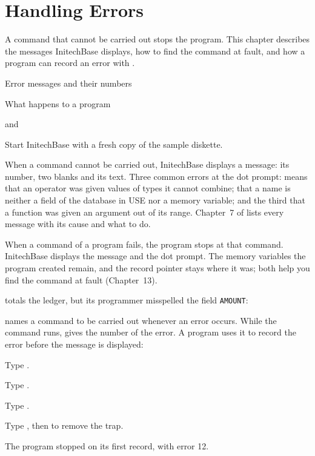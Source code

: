 \chapter{Handling Errors}
A command that cannot be carried out stops the program.  This chapter
describes the messages InitechBase displays, how to find the command at fault,
and how a program can record an error with .

\begin{ChapterCovers}
\item Error messages and their numbers
\item What happens to a program
\item {} and 
\end{ChapterCovers}

Start InitechBase with a fresh copy of the sample diskette.

When a command cannot be carried out, InitechBase displays a message: its
number, two blanks and its text.  Three common errors at the dot prompt:
 means that an operator was given values of types
it cannot combine;  that a name is neither a field
of the database in USE nor a memory variable; and the third that a function was
given an argument out of its range.  Chapter~7 of 
lists every message with its cause and what to do.

When a command of a program fails, the program stops at that command.
InitechBase displays the message and the dot prompt.  The memory variables the
program created remain, and the record pointer stays where it was; both help
you find the command at fault (Chapter~13).

 totals the ledger, but its programmer misspelled the field
\texttt{AMOUNT}:

 names a command to be carried out whenever an error occurs.  While
the command runs,  gives the number of the error.  A program uses it
to record the error before the message is displayed:
\begin{Steps}
\item Type .
\item Type .
\item Type .
\item Type , then  to remove the trap.
\end{Steps}
The program stopped on its first record, with error 12.


